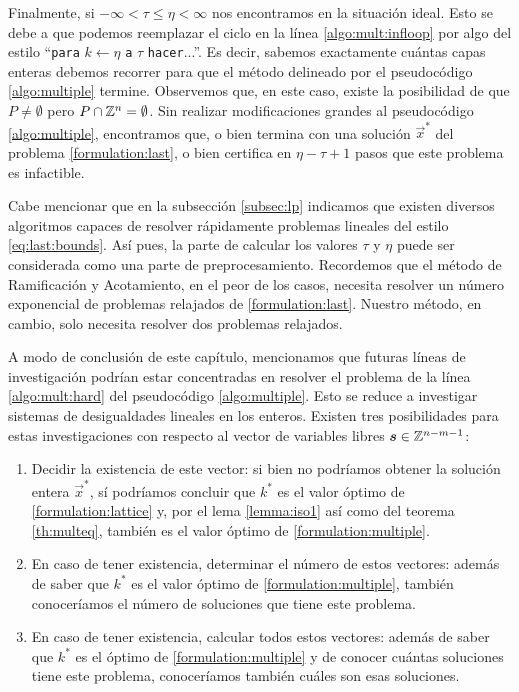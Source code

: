 Finalmente, si $-\infty < \tau \leq \eta < \infty$ nos encontramos en la situación ideal. Esto
se debe a que podemos reemplazar el ciclo en la línea \ref{algo:mult:infloop} por algo del estilo
``\texttt{para} $k \leftarrow \eta$ \texttt{a} $\tau$ \texttt{hacer}...''. Es decir, sabemos exactamente
cuántas capas enteras debemos recorrer para que el método delineado por el pseudocódigo
\ref{algo:multiple} termine. Observemos que, en este caso, existe la posibilidad de que $P \neq
\emptyset$ pero $P \cap \mathbb{Z}^n = \emptyset$. Sin realizar modificaciones grandes al pseudocódigo
\ref{algo:multiple}, encontramos que, o bien termina con una solución $\vec{x}^*$ del problema
\eqref{formulation:last}, o bien certifica en $\eta - \tau + 1$ pasos que este problema es infactible.

Cabe mencionar que en la subsección \eqref{subsec:lp} indicamos que existen diversos algoritmos
capaces de resolver rápidamente problemas lineales del estilo \eqref{eq:last:bounds}. Así pues, la
parte de calcular los valores $\tau$ y $\eta$ puede ser considerada como una parte de
preprocesamiento. Recordemos que el método de Ramificación y Acotamiento, en el peor de los casos,
necesita resolver un número exponencial de problemas relajados de \eqref{formulation:last}. Nuestro
método, en cambio, solo necesita resolver dos problemas relajados.

A modo de conclusión de este capítulo, mencionamos que futuras líneas de
investigación podrían estar concentradas en resolver el problema de la línea \ref{algo:mult:hard}
del pseudocódigo \ref{algo:multiple}. Esto se reduce a investigar sistemas de desigualdades lineales
en los enteros. Existen tres posibilidades para estas investigaciones con respecto al vector de
variables libres $\boldsymbol{s} \in \mathbb{Z}^{n-m-1}$:
\begin{enumerate}
	\item Decidir la existencia de este vector: si bien no podríamos obtener la solución entera
		$\vec{x}^*$, sí podríamos concluir que $k^*$ es el valor óptimo de
		\eqref{formulation:lattice} y, por el lema \ref{lemma:iso1} así como del teorema
		\ref{th:multeq}, también es el valor óptimo de \eqref{formulation:multiple}.
	\item En caso de tener existencia, determinar el número de estos vectores: además de saber que
		$k^*$ es el valor óptimo de \eqref{formulation:multiple}, también conoceríamos el número de
		soluciones que tiene este problema.
	\item En caso de tener existencia, calcular todos estos vectores: además de saber que $k^*$ es
		el óptimo de \eqref{formulation:multiple} y de conocer cuántas soluciones tiene este
		problema, conoceríamos también cuáles son esas soluciones.
\end{enumerate}

